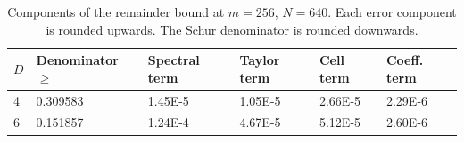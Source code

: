 \begin{table}[htbp]
\centering
\caption{Components of the remainder bound at $m=256$, $N=640$. Each error component is rounded upwards. The Schur denominator is rounded downwards.}
\label{tab:sharp_budget}
\begin{tabular}{llllll}
\toprule
$D$ & Denominator $\geq$ & Spectral term & Taylor term & Cell term & Coeff. term \\
\midrule
4 & 0.309583 & 1.45E-5 & 1.05E-5 & 2.66E-5 & 2.29E-6 \\
6 & 0.151857 & 1.24E-4 & 4.67E-5 & 5.12E-5 & 2.60E-6 \\
\bottomrule
\end{tabular}
\end{table}
